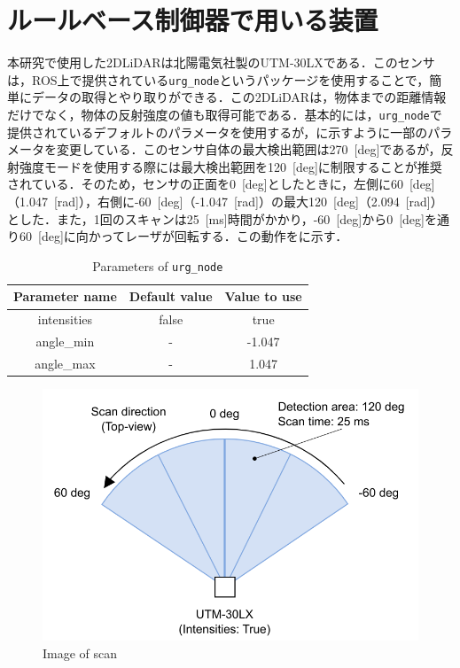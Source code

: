 
\section{ルールベース制御器で用いる装置}

  本研究で使用した2DLiDARは北陽電気社製のUTM-30LX\cite{hokuyo}である．このセンサは，ROS上で提供されている\texttt{urg\_node}\cite{urg_node}というパッケージを使用することで，簡単にデータの取得とやり取りができる．この2DLiDARは，物体までの距離情報だけでなく，物体の反射強度の値も取得可能である．基本的には，\texttt{urg\_node}で提供されているデフォルトのパラメータを使用するが，に示すように一部のパラメータを変更している．このセンサ自体の最大検出範囲は270 \,[deg]であるが，反射強度モードを使用する際には最大検出範囲を120 \,[deg]に制限することが推奨されている\cite{urg_node}．そのため，センサの正面を0 \,[deg]としたときに，左側に60 \,[deg]（1.047 \,[rad]），右側に-60 \,[deg]（-1.047 \,[rad]）の最大120 \,[deg]（2.094 \,[rad]）とした．また，1回のスキャンは25 \,[ms]時間がかかり，-60 \,[deg]から0 \,[deg]を通り60 \,[deg]に向かってレーザが回転する．この動作をに示す．

  \begin{table}[hbtp]
    \caption{Parameters of \texttt{urg\_node}}
    \label{tab:parameters_of_urg_node}
    \centering
    \begin{tabular}{ccc}
    \hline
    Parameter name & Default value & Value to use \\ 
    \hline
    \hline
    intensities & false   & true         \\ 
    angle\_min  & -       & -1.047       \\ 
    angle\_max  & -       & 1.047        \\ 
    \hline
    \end{tabular}
    \end{table}

    \begin{figure}[h]
      \centering
      \includegraphics[keepaspectratio, scale=0.30] {images/RobotGuidance_hokuyo_scan.png}
      \captionsetup{justification=raggedright} %
      \caption{Image of scan}
      \label{Fig:Image of scan}
    \end{figure}

\newpage